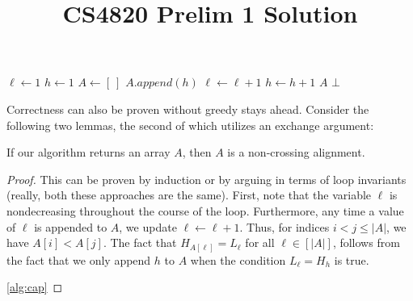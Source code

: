 \documentclass{article}
\title{CS4820 Prelim 1 Solution}
\begin{document}
\maketitle

\begin{algorithm}
\caption{Greedy Sequence Alignment}\label{alg:cap}
\begin{algorithmic}
\State $\ell \gets 1$
\State $h \gets 1$
\State $A \gets [ ~ ]$
     
        \State $A.append(h)$
        \State $\ell \gets \ell + 1$
    \EndIf
    \State $h \gets h + 1$
\EndWhile
{} 
    \State \Return $A$
\Else
    \State \Return $\bot$
\EndIf
\end{algorithmic}
\end{algorithm}

Correctness can also be proven without greedy stays ahead. Consider the following two lemmas, the second of which utilizes an exchange argument:

\begin{lemma}
   If our algorithm returns an array $A$, then $A$ is a non-crossing alignment.
\end{lemma}
\begin{proof}
  This can be proven by induction or by arguing in terms of loop invariants (really, both these approaches are the same). First, note that the variable $\ell$ is nondecreasing throughout the course of the loop. Furthermore, any time a value of $\ell$ is appended to $A$, we update $\ell \leftarrow \ell + 1$. Thus, for indices $i < j \le |A|$, we have $A[i] < A[j]$. The fact that $H_{A[\ell]} = L_{\ell}$ for all $\ell\in [|A|]$, follows from the fact that we only append $h$ to $A$ when the condition $L_\ell = H_h$ is true.

  \ref{alg:cap}
\end{proof}
\end{document}
